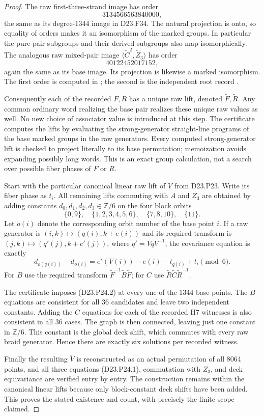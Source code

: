 \begin{proof}
The raw first-three-strand image has order
\[
                     3134566563840000,
\]
the same as its degree-1344 image in D23.F34. The natural
projection is onto, so equality of orders makes it an
isomorphism of the marked groups. In particular the
pure-pair subgroups and their derived subgroups also map
isomorphically. The analogous raw mixed-pair image
$\langle\widetilde C^2,\widetilde Z_3\rangle$ has order
\[
                        40122452017152,
\]
again the same as its base image. Its projection is
likewise a marked isomorphism. The first order is computed
in ; the second is the
independent root record
.

Consequently each of the recorded $F,R$ has a unique raw
lift, denoted $\widetilde F,\widetilde R$. Any common
ordinary word realizing the base pair realizes these unique
raw values as well. No new choice of associator value is
introduced at this step. The certificate computes the lifts
by evaluating the strong-generator straight-line programs
of the base marked groups in the raw generators. Every
computed strong-generator lift is checked to project
literally to its base permutation; memoization avoids
expanding possibly long words. This is an exact group
calculation, not a search over possible fiber phases of
$F$ or $R$.

Start with the particular canonical linear raw lift of
$V$ from D23.P23. Write its fiber phase as $t_i$. All
remaining lifts commuting with $A$ and $Z_3$ are obtained
by adding constants $d_0,d_1,d_2,d_3\in\mathbb Z/6$
on the four block orbits
\[
 \{0,9\},\quad\{1,2,3,4,5,6\},\quad
 \{7,8,10\},\quad\{11\}.
\]
Let $o(i)$ denote the corresponding orbit number of the
base point $i$. If a raw generator is
$(i,k)\mapsto(q(i),k+e(i))$ and its required transform
is $(j,k)\mapsto(q'(j),k+e'(j))$, where
$q'=VqV^{-1}$, the covariance equation is exactly
\[
 d_{o(q(i))}-d_{o(i)}
     = e'(V(i))-e(i)-t_{q(i)}+t_i \pmod6.                 \tag{D23.P24.2}
\]
For $B$ use the required transform
$\widetilde F^{-1}\widetilde B\widetilde F$; for $C$
use $\widetilde R\widetilde C\widetilde R^{-1}$.

The certificate imposes (D23.P24.2) at every one of the
1344 base points. The $B$ equations are consistent for
all 36 candidates and leave two independent constants.
Adding the $C$ equations for each of the recorded H7
witnesses is also consistent in all 36 cases. The graph
is then connected, leaving just one constant in
$\mathbb Z/6$. This constant is the global deck shift,
which commutes with every raw braid generator. Hence
there are exactly six solutions per recorded witness.

Finally the resulting $\widetilde V$ is reconstructed
as an actual permutation of all 8064 points, and all
three equations (D23.P24.1), commutation with $Z_3$, and
deck equivariance are verified entry by entry. The
construction remains within the canonical linear lifts
because only block-constant deck shifts have been added.
This proves the stated existence and count, with precisely
the finite scope claimed.
\end{proof}

